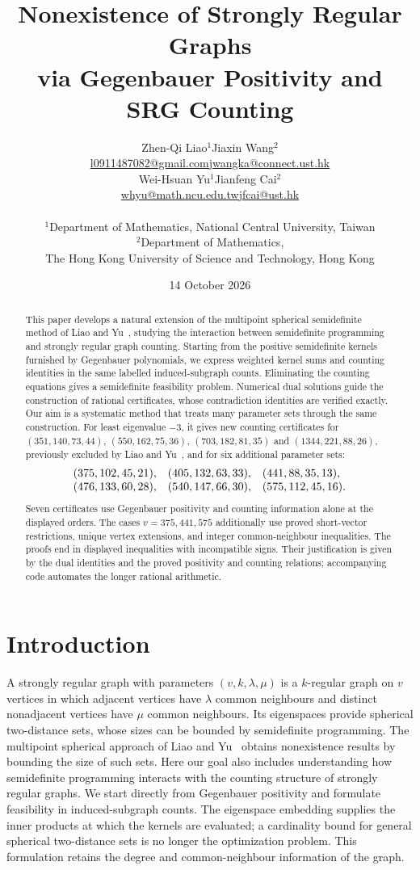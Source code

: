 \documentclass[11pt]{article}
\title{Nonexistence of Strongly Regular Graphs\\
via Gegenbauer Positivity and SRG Counting}
\author{%
\begin{tabular}{cc}
Zhen-Qi Liao$^{1}$ & Jiaxin Wang$^{2}$\\[2pt]
\small\href{mailto:l0911487082@gmail.com}{l0911487082@gmail.com} &
\small\href{mailto:jwangka@connect.ust.hk}{jwangka@connect.ust.hk}\\[7pt]
Wei-Hsuan Yu$^{1}$ & Jianfeng Cai$^{2}$\\[2pt]
\small\href{mailto:whyu@math.ncu.edu.tw}{whyu@math.ncu.edu.tw} &
\small\href{mailto:jfcai@ust.hk}{jfcai@ust.hk}
\end{tabular}\\[8pt]
\small $^{1}$Department of Mathematics, National Central University, Taiwan\\[3pt]
\small $^{2}$Department of Mathematics,\\[-2pt]
\small The Hong Kong University of Science and Technology, Hong Kong}
\date{14 October 2026}
\theoremstyle{remark}
\numberwithin{equation}{section}
\begin{document}
\maketitle
\begin{abstract}
This paper develops a natural extension of the multipoint spherical
semidefinite method of Liao and Yu~\cite{LY}, studying the interaction
between semidefinite programming and strongly regular graph counting.
Starting from the positive semidefinite kernels furnished by Gegenbauer
polynomials, we express weighted kernel sums and counting identities
in the same labelled induced-subgraph counts. Eliminating the counting
equations gives a semidefinite feasibility problem. Numerical dual
solutions guide the construction of rational certificates, whose
contradiction identities are verified exactly. Our aim is a
systematic method that treats many parameter sets through the same
construction. For least eigenvalue $-3$, it gives new counting
certificates for
$(351,140,73,44)$, $(550,162,75,36)$, $(703,182,81,35)$ and
$(1344,221,88,26)$, previously excluded by Liao and
Yu~\cite[Theorem~1]{LY}, and for six additional parameter sets:
\[
\begin{array}{@{}lll@{}}
(375,102,45,21), & (405,132,63,33), & (441,88,35,13),\\
(476,133,60,28), & (540,147,66,30), & (575,112,45,16).
\end{array}
\]
Seven certificates use Gegenbauer positivity
and counting information alone at the displayed orders. The cases
$v=375,441,575$ additionally use proved short-vector restrictions,
unique vertex extensions, and integer common-neighbour inequalities.
The proofs end in displayed inequalities with incompatible signs.
Their justification is given by the dual identities and the proved
positivity and counting relations; accompanying code automates the
longer rational arithmetic.
\end{abstract}

\section{Introduction}\label{sec:intro}
A strongly regular graph with parameters $(v,k,\lambda,\mu)$ is a
$k$-regular graph on $v$ vertices in which adjacent vertices have
$\lambda$ common neighbours and distinct nonadjacent vertices have
$\mu$ common neighbours. Its eigenspaces provide spherical two-distance
sets, whose sizes can be bounded by semidefinite programming.
The multipoint spherical approach of Liao and Yu~\cite{LY} obtains
nonexistence results by bounding the size of such sets. Here our goal
also includes understanding how semidefinite programming interacts with
the counting structure of strongly regular graphs. We start directly
from Gegenbauer positivity and formulate feasibility in induced-subgraph
counts. The eigenspace embedding supplies the inner products at which
the kernels are evaluated; a cardinality bound for general spherical
two-distance sets is no longer the optimization problem. This formulation
retains the degree and common-neighbour information of the graph.
\end{document}
